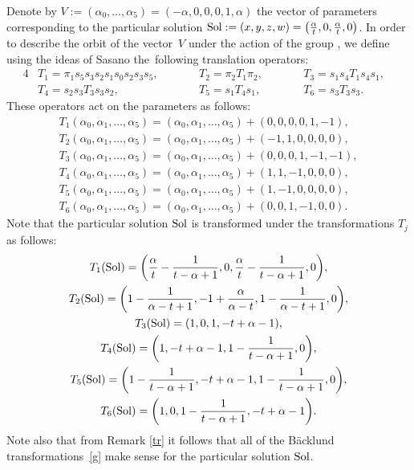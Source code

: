 \documentclass[10pt,a4paper]{amsart}
\numberwithin{equation}{section}
\begin{document}
 Denote by $V:=(\alpha_0, \dots, \alpha_5)=(-\alpha, 0, 0, 0, 1, \alpha)$ the vector of parameters corresponding to the
 particular solution ${\rm Sol}:=(x, y, z, w)=\bigl(\frac{\alpha}{t}, 0, \frac{\alpha}{t}, 0\bigr)$. In order to
 describe the orbit of the vector~$V$ under the action of the group , we define
 using the ideas of Sasano the~following translation operators:
 \begin{alignat*}{4}
 &T_1=\pi_1 s_5 s_3 s_2 s_1 s_0 s_2 s_3 s_5,\qquad&&
 T_2=\pi_2 T_1 \pi_2, \qquad&& T_3=s_1 s_4 T_1 s_4 s_1, &\\
 &T_4=s_2 s_3 T_3 s_3 s_2,
 \qquad&& T_5=s_1 T_4 s_1,\qquad&&
 T_6=s_3 T_3 s_3 .&
 \end{alignat*}
 These operators act on the parameters as follows:
 \begin{gather*}
 T_1(\alpha_0, \alpha_1, \dots, \alpha_5) =
 (\alpha_0, \alpha_1, \dots, \alpha_5) + (0, 0, 0, 0, 1, -1),\\
 T_2(\alpha_0, \alpha_1, \dots, \alpha_5) =
 (\alpha_0, \alpha_1, \dots, \alpha_5) + (-1, 1, 0, 0, 0, 0),\\
 T_3(\alpha_0, \alpha_1, \dots, \alpha_5) =
 (\alpha_0, \alpha_1, \dots, \alpha_5) + (0, 0, 0, 1, -1, -1),\\
 T_4(\alpha_0, \alpha_1, \dots, \alpha_5) =
 (\alpha_0, \alpha_1, \dots, \alpha_5) + (1, 1, -1, 0, 0, 0),\\
 T_5(\alpha_0, \alpha_1, \dots, \alpha_5) =
 (\alpha_0, \alpha_1, \dots, \alpha_5) + (1, -1, 0, 0, 0, 0),\\
 T_6(\alpha_0, \alpha_1, \dots, \alpha_5) =
 (\alpha_0, \alpha_1, \dots, \alpha_5) + (0, 0, 1, -1, 0, 0) .
 \end{gather*}
 Note that the particular solution ${\rm Sol}$
 is transformed under the transformations $T_j$ as follows:
 \begin{gather*}
 T_1 ({\rm Sol}) =
 \biggl(\frac{\alpha}{t} - \frac{1}{t-\alpha+1}, 0, \frac{\alpha}{t} - \frac{1}{t-\alpha+1}, 0\biggr),\\
 T_2 ({\rm Sol}) =
 \biggl(1- \frac{1}{\alpha-t+1}, -1 + \frac{\alpha}{\alpha-t}, 1- \frac{1}{\alpha-t+1}, 0\biggr),\\
 T_3({\rm Sol}) =
 (1, 0, 1, -t+\alpha-1),\\
 T_4({\rm Sol}) =
 \biggl(1, -t + \alpha-1, 1 - \frac{1}{t-\alpha+1}, 0\biggr),\\
 T_5({\rm Sol}) =
 \biggl(1 - \frac{1}{t-\alpha+1}, -t+\alpha-1, 1- \frac{1}{t-\alpha+1}, 0\biggr),\\
 T_6({\rm Sol}) =
 \biggl(1 , 0, 1- \frac{1}{t-\alpha+1}, -t + \alpha-1\biggr) .
 \end{gather*}
 Note also that from Remark \ref{tr} it follows that all of the B\"{a}cklund transformations~\eqref{g} make sense for the particular solution
 ${\rm Sol}$.
\end{document}
